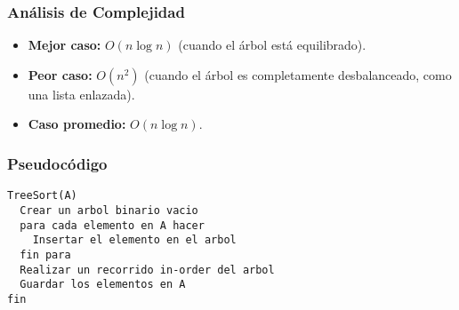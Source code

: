 \documentclass[11pt,openany]{book}
\begin{document}
\subsubsection{Análisis de Complejidad}
\begin{itemize}
    \item \textbf{Mejor caso:} $O(n \log n)$ (cuando el árbol está equilibrado).
    \item \textbf{Peor caso:} $O(n^2)$ (cuando el árbol es completamente desbalanceado, como una lista enlazada).
    \item \textbf{Caso promedio:} $O(n \log n)$.
\end{itemize}

\subsubsection{Pseudocódigo}
\begin{verbatim}
TreeSort(A)
  Crear un arbol binario vacio
  para cada elemento en A hacer
    Insertar el elemento en el arbol
  fin para
  Realizar un recorrido in-order del arbol
  Guardar los elementos en A
fin
\end{verbatim}
\end{document}
